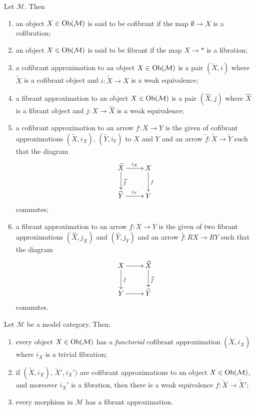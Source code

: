 \begin{defin}
Let $\mathcal M$. Then
\begin{enumerate}
\item an object $X \in \mathrm{Ob}(\mathcal M)$ is said to be cofibrant if the map $\emptyset \to X$ is a cofibration;
\item an object $X \in \mathrm{Ob}(\mathcal M)$ is said to be fibrant if the map $X \to *$ is a fibration;
\item a cofibrant approximation to an object $X \in \mathrm{Ob}(\mathcal M)$ is a pair $(\widetilde{X},i)$ where $\widetilde{X}$ is a cofibrant object and $i \colon \widetilde{X} \to X$ is a weak equivalence;
\item a fibrant approximation to an object $X \in \mathrm{Ob}(\mathcal M)$ is a pair $(\widehat{X},j)$ where $\widehat{X}$ is a fibrant object and $j \colon X \to \widehat{X}$ is a weak equivalence;
\item a cofibrant approximation to an arrow $f \colon X \to Y$ is the given of cofibrant approximations $(\widetilde{X},i_X)$, $(\widetilde{Y},i_Y)$ to $X$ and $Y$ and an arrow $\widetilde{f} \colon \widetilde{X} \to \widetilde{Y}$ such that the diagram
\[
\xymatrix{ \widetilde{X} \ar[r]^{i_X} \ar[d]^{\widetilde{f}} & X \ar[d]^f \\ \widetilde{Y} \ar[r]^{i_Y} & Y }
\]
commutes;
\item a fibrant approximation to an arrow $f \colon X \to Y$ is the given of two fibrant approximations $(\widehat{X},j_X)$ and $(\widehat{Y},j_Y)$ and an arrow $\widehat{f} \colon RX \to RY$ such that the diagram
\[
\xymatrix{ X \ar[r] \ar[d]^f & \widehat{X} \ar[d]^{\widehat{f}} \\ Y \ar[r] & \widehat{Y} }
\]
commutes.
\end{enumerate}
\end{defin}

\begin{prop} \label{prop approximations}
Let $\mathcal M$ be a model category. Then:
\begin{enumerate}
\item every object $X \in \mathrm{Ob}(\mathcal M)$ has a \emph{functorial} cofibrant approximation $(\widetilde{X},i_X)$ where $i_X$ is a trivial fibration;
\item if $(\widetilde{X},i_X)$, $\widetilde{X}',i_X')$ are cofibrant approximations to an object $X \in \mathrm{Ob}(\mathcal M)$, and moreover $i_X'$ is a fibration, then there is a weak equivalence $f \colon \widetilde{X} \to \widetilde{X}'$;
\item every morphism in $\mathcal M$ has a fibrant approximation.
\end{enumerate}
\end{prop}

